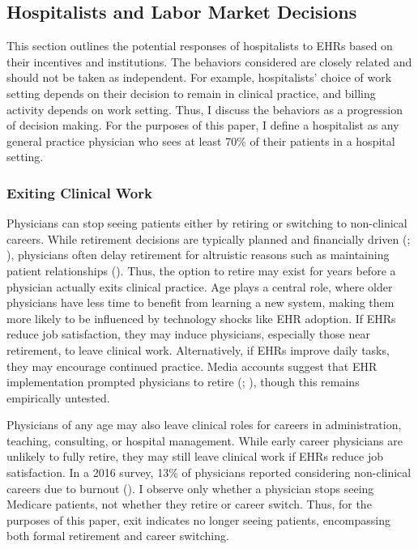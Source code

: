 \documentclass[12pt]{article}
\begin{document}
\subsection{Hospitalists and Labor Market Decisions}

This section outlines the potential responses of hospitalists to EHRs based on their incentives and institutions. The behaviors considered are closely related and should not be taken as independent. For example, hospitalists' choice of work setting depends on their decision to remain in clinical practice, and billing activity depends on work setting. Thus, I discuss the behaviors as a progression of decision making. For the purposes of this paper, I define a hospitalist as any general practice physician who sees at least 70\% of their patients in a hospital setting. 

\subsubsection{Exiting Clinical Work}

Physicians can stop seeing patients either by retiring or switching to non-clinical careers. While retirement decisions are typically planned and financially driven (\cite{gustman1986disaggregated}; \cite{stock1990pension}), physicians often delay retirement for altruistic reasons such as maintaining patient relationships (\cite{collier2017challenges}). Thus, the option to retire may exist for years before a physician actually exits clinical practice. Age plays a central role, where older physicians have less time to benefit from learning a new system, making them more likely to be influenced by technology shocks like EHR adoption. If EHRs reduce job satisfaction, they may induce physicians, especially those near retirement, to leave clinical work. Alternatively, if EHRs improve daily tasks, they may encourage continued practice. Media accounts suggest that EHR implementation prompted physicians to retire (\cite{ringel_2019}; \cite{loria_2020}), though this remains empirically untested.

Physicians of any age may also leave clinical roles for careers in administration, teaching, consulting, or hospital management. While early career physicians are unlikely to fully retire, they may still leave clinical work if EHRs reduce job satisfaction. In a 2016 survey, 13\% of physicians reported considering non-clinical careers due to burnout (\cite{physicians2016physicians}). I observe only whether a physician stops seeing Medicare patients, not whether they retire or career switch. Thus, for the purposes of this paper, exit indicates no longer seeing patients, encompassing both formal retirement and career switching.
\end{document}
